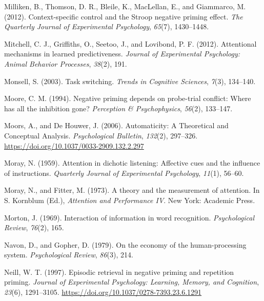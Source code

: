 \documentclass[]{DissertateCUNY}
\begin{document}
\leavevmode\hypertarget{ref-milliken_context-specific_2012}{}%
Milliken, B., Thomson, D. R., Bleile, K., MacLellan, E., and Giammarco,
M. (2012). Context-specific control and the Stroop negative priming
effect. \emph{The Quarterly Journal of Experimental Psychology},
\emph{65}(7), 1430--1448.

\leavevmode\hypertarget{ref-mitchell_attentional_2012}{}%
Mitchell, C. J., Griffiths, O., Seetoo, J., and Lovibond, P. F. (2012).
Attentional mechanisms in learned predictiveness. \emph{Journal of
Experimental Psychology: Animal Behavior Processes}, \emph{38}(2), 191.

\leavevmode\hypertarget{ref-monsell_task_2003}{}%
Monsell, S. (2003). Task switching. \emph{Trends in Cognitive Sciences},
\emph{7}(3), 134--140.

\leavevmode\hypertarget{ref-moore_negative_1994}{}%
Moore, C. M. (1994). Negative priming depends on probe-trial conflict:
Where has all the inhibition gone? \emph{Perception \& Psychophysics},
\emph{56}(2), 133--147.

\leavevmode\hypertarget{ref-moors_automaticity_2006}{}%
Moors, A., and De Houwer, J. (2006). Automaticity: A Theoretical and
Conceptual Analysis. \emph{Psychological Bulletin}, \emph{132}(2),
297--326. \url{https://doi.org/10.1037/0033-2909.132.2.297}

\leavevmode\hypertarget{ref-moray_attention_1959}{}%
Moray, N. (1959). Attention in dichotic listening: Affective cues and
the influence of instructions. \emph{Quarterly Journal of Experimental
Psychology}, \emph{11}(1), 56--60.

\leavevmode\hypertarget{ref-moray_theory_1973}{}%
Moray, N., and Fitter, M. (1973). A theory and the measurement of
attention. In S. Kornblum (Ed.), \emph{Attention and Performance IV}.
New York: Academic Press.

\leavevmode\hypertarget{ref-morton_interaction_1969}{}%
Morton, J. (1969). Interaction of information in word recognition.
\emph{Psychological Review}, \emph{76}(2), 165.

\leavevmode\hypertarget{ref-navon_economy_1979}{}%
Navon, D., and Gopher, D. (1979). On the economy of the human-processing
system. \emph{Psychological Review}, \emph{86}(3), 214.

\leavevmode\hypertarget{ref-neill_episodic_1997}{}%
Neill, W. T. (1997). Episodic retrieval in negative priming and
repetition priming. \emph{Journal of Experimental Psychology: Learning,
Memory, and Cognition}, \emph{23}(6), 1291--3105.
\url{https://doi.org/10.1037/0278-7393.23.6.1291}
\end{document}
